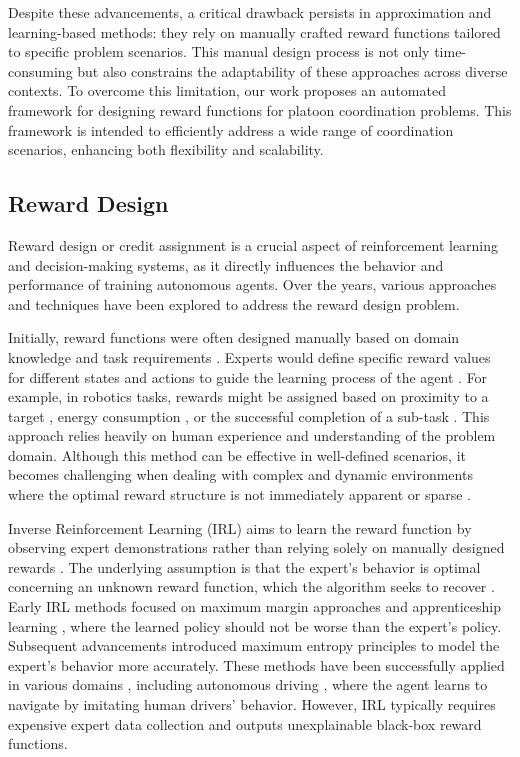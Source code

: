 \documentclass[lettersize,journal]{IEEEtran}
\begin{document}
Despite these advancements, a critical drawback persists in approximation and learning-based methods: they rely on manually crafted reward functions tailored to specific problem scenarios. This manual design process is not only time-consuming but also constrains the adaptability of these approaches across diverse contexts. To overcome this limitation, our work proposes an automated framework for designing reward functions for platoon coordination problems. This framework is intended to efficiently address a wide range of coordination scenarios, enhancing both flexibility and scalability.



\subsection{Reward Design}
Reward design or credit assignment is a crucial aspect of reinforcement learning and decision-making systems, as it directly influences the behavior and performance of training autonomous agents. 
Over the years, various approaches and techniques have been explored to address the reward design problem.

Initially, reward functions were often designed manually based on domain knowledge and task requirements \cite{singh2009rewards,laud2004theory}. 
Experts would define specific reward values for different states and actions to guide the learning process of the agent \cite{chu2019multi,gupta2022unpacking}. 
For example, in robotics tasks, rewards might be assigned based on proximity to a target \cite{kober2013reinforcement}, energy consumption \cite{arulkumaran2017deep}, or the successful completion of a sub-task \cite{singh2022reinforcement}. 
This approach relies heavily on human experience and understanding of the problem domain. 
Although this method can be effective in well-defined scenarios, it becomes challenging when dealing with complex and dynamic environments where the optimal reward structure is not immediately apparent or sparse \cite{eschmann2021reward,ibrahim2024comprehensive}.

Inverse Reinforcement Learning (IRL) aims to learn the reward function by observing expert demonstrations rather than relying solely on manually designed rewards \cite{ng2000algorithms}. 
The underlying assumption is that the expert's behavior is optimal concerning an unknown reward function, which the algorithm seeks to recover \cite{abbeel2004apprenticeship}. 
Early IRL methods focused on maximum margin approaches \cite{ratliff2006maximum} and apprenticeship learning \cite{syed2007game}, where the learned policy should not be worse than the expert's policy. 
Subsequent advancements introduced maximum entropy principles \cite{ziebart2008maximum} to model the expert's behavior more accurately. 
These methods have been successfully applied in various domains \cite{levine2018learning,shah2022inverse,uchibe2018model}, including autonomous driving \cite{codevilla2018end}, where the agent learns to navigate by imitating human drivers' behavior.
However, IRL typically requires expensive expert data collection and outputs unexplainable black-box reward functions.
\end{document}
